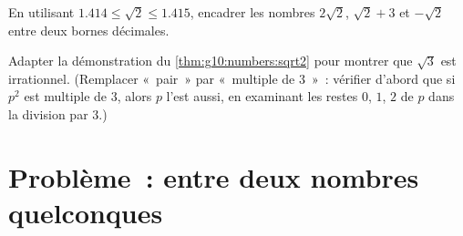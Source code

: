 \begin{exercise}[$\star\star$]\label{exo:g10:numbers:9}
En utilisant $1.414 \leq \sqrt 2 \leq 1.415$, encadrer les nombres
$2\sqrt2$, $\sqrt2 + 3$ et $-\sqrt2$ entre deux bornes décimales.
\end{exercise}

\begin{exercise}[$\star\star\star$]\label{exo:g10:numbers:10}
Adapter la démonstration du \cref{thm:g10:numbers:sqrt2} pour montrer
que $\sqrt 3$ est irrationnel. (Remplacer «~pair~» par «~multiple de
$3$~»~: vérifier d'abord que si $p^2$ est multiple de $3$, alors $p$
l'est aussi, en examinant les restes $0$, $1$, $2$ de $p$ dans la
division par $3$.)
\end{exercise}

\section{Problème~: entre deux nombres quelconques}

